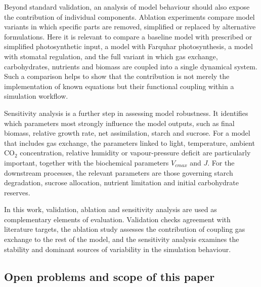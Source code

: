\documentclass[a4paper,fleqn]{cas-sc}
\begin{document}
Beyond standard validation, an analysis of model behaviour should also expose the contribution of individual components. Ablation experiments compare model variants in which specific parts are removed, simplified or replaced by alternative formulations. Here it is relevant to compare a baseline model with prescribed or simplified photosynthetic input, a model with Farquhar photosynthesis, a model with stomatal regulation, and the full variant in which gas exchange, carbohydrates, nutrients and biomass are coupled into a single dynamical system. Such a comparison helps to show that the contribution is not merely the implementation of known equations but their functional coupling within a simulation workflow.

Sensitivity analysis is a further step in assessing model robustness. It identifies which parameters most strongly influence the model outputs, such as final biomass, relative growth rate, net assimilation, starch and sucrose. For a model that includes gas exchange, the parameters linked to light, temperature, ambient CO$_2$ concentration, relative humidity or vapour-pressure deficit are particularly important, together with the biochemical parameters $V_{cmax}$ and $J$. For the downstream processes, the relevant parameters are those governing starch degradation, sucrose allocation, nutrient limitation and initial carbohydrate reserves.

In this work, validation, ablation and sensitivity analysis are used as complementary elements of evaluation. Validation checks agreement with literature targets, the ablation study assesses the contribution of coupling gas exchange to the rest of the model, and the sensitivity analysis examines the stability and dominant sources of variability in the simulation behaviour.

\subsection{Open problems and scope of this paper}
\label{sec:gap}
\end{document}
